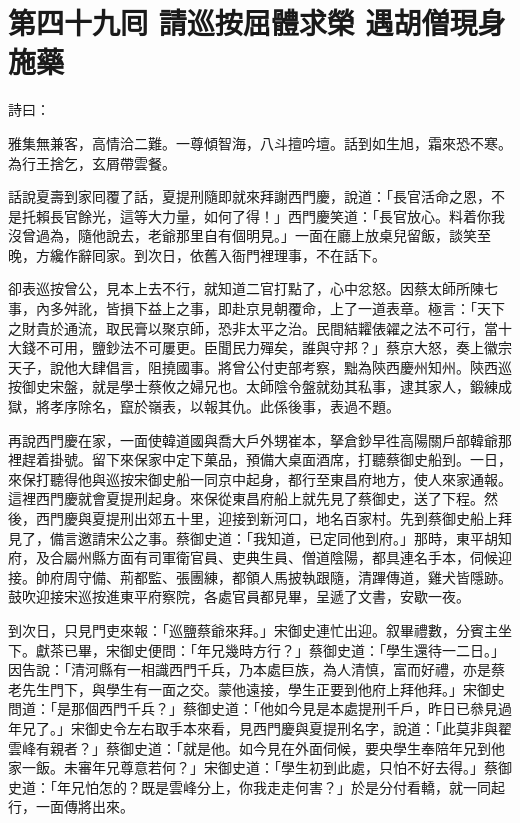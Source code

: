 
\chapter*{第四十九囘 請巡按屈體求榮 遇胡僧現身施藥}


詩曰：

雅集無兼客，高情洽二難。一尊傾智海，八斗擅吟壇。話到如生旭，霜來恐不寒。為行王捨乞，玄屑帶雲餐。

話說夏壽到家囘覆了話，夏提刑隨即就來拜謝西門慶，說道：「長官活命之恩，不是托賴長官餘光，這等大力量，如何了得！」西門慶笑道：「長官放心。料着你我沒曾過為，隨他說去，老爺那里自有個明見。」一面在廳上放桌兒留飯，談笑至晚，方纔作辭囘家。到次日，依舊入衙門裡理事，不在話下。

卻表巡按曾公，見本上去不行，就知道二官打點了，心中忿怒。因蔡太師所陳七事，內多舛訛，皆損下益上之事，即赴京見朝覆命，上了一道表章。極言：「天下之財貴於通流，取民膏以聚京師，恐非太平之治。民間結糶俵糴之法不可行，當十大錢不可用，鹽鈔法不可屢更。臣聞民力殫矣，誰與守邦？」蔡京大怒，奏上徽宗天子，說他大肆倡言，阻撓國事。將曾公付吏部考察，黜為陝西慶州知州。陝西巡按御史宋盤，就是學士蔡攸之婦兄也。太師陰令盤就劾其私事，逮其家人，鍛練成獄，將孝序除名，竄於嶺表，以報其仇。此係後事，表過不題。

再說西門慶在家，一面使韓道國與喬大戶外甥崔本，拏倉鈔早徃高陽關戶部韓爺那裡趕着掛號。留下來保家中定下菓品，預備大桌面酒席，打聽蔡御史船到。一日，來保打聽得他與巡按宋御史船一同京中起身，都行至東昌府地方，使人來家通報。這裡西門慶就會夏提刑起身。來保從東昌府船上就先見了蔡御史，送了下程。然後，西門慶與夏提刑出郊五十里，迎接到新河口，地名百家村。先到蔡御史船上拜見了，備言邀請宋公之事。蔡御史道：「我知道，已定同他到府。」那時，東平胡知府，及合屬州縣方面有司軍衛官員、吏典生員、僧道陰陽，都具連名手本，伺候迎接。帥府周守備、荊都監、張團練，都領人馬披執跟隨，清蹕傳道，雞犬皆隱跡。鼓吹迎接宋巡按進東平府察院，各處官員都見畢，呈遞了文書，安歇一夜。

到次日，只見門吏來報：「巡鹽蔡爺來拜。」宋御史連忙出迎。叙畢禮數，分賓主坐下。獻茶已畢，宋御史便問：「年兄幾時方行？」蔡御史道：「學生還待一二日。」因告說：「清河縣有一相識西門千兵，乃本處巨族，為人清慎，富而好禮，亦是蔡老先生門下，與學生有一面之交。蒙他遠接，學生正要到他府上拜他拜。」宋御史問道：「是那個西門千兵？」蔡御史道：「他如今見是本處提刑千戶，昨日已叅見過年兄了。」宋御史令左右取手本來看，見西門慶與夏提刑名字，說道：「此莫非與翟雲峰有親者？」蔡御史道：「就是他。如今見在外面伺候，要央學生奉陪年兄到他家一飯。未審年兄尊意若何？」宋御史道：「學生初到此處，只怕不好去得。」蔡御史道：「年兄怕怎的？既是雲峰分上，你我走走何害？」{}於是分付看轎，就一同起行，一面傳將出來。

